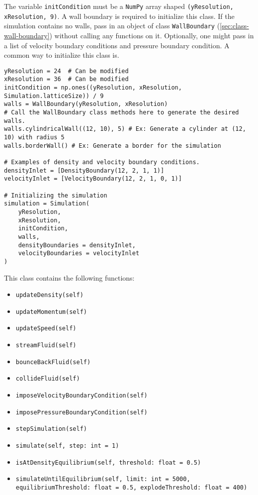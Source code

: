 The variable \texttt{initCondition} must be a \texttt{NumPy} array shaped \texttt{(yResolution, xResolution, 9)}. A wall boundary is required to initialize this class. If the simulation contains no walls, pass in an object of class \texttt{WallBoundary} (\cref{sec:class-wall-boundary}) without calling any functions on it. Optionally, one might pass in a list of velocity boundary conditions and pressure boundary condition. A common way to initialize this class is.
\begin{verbatim}
yResolution = 24  # Can be modified
xResolution = 36  # Can be modified
initCondition = np.ones((yResolution, xResolution, Simulation.latticeSize)) / 9
walls = WallBoundary(yResolution, xResolution)
# Call the WallBoundary class methods here to generate the desired walls.
walls.cylindricalWall((12, 10), 5) # Ex: Generate a cylinder at (12, 10) with radius 5
walls.borderWall() # Ex: Generate a border for the simulation

# Examples of density and velocity boundary conditions.
densityInlet = [DensityBoundary(12, 2, 1, 1)]
velocityInlet = [VelocityBoundary(12, 2, 1, 0, 1)]

# Initializing the simulation
simulation = Simulation(
    yResolution,
    xResolution,
    initCondition,
    walls,
    densityBoundaries = densityInlet,
    velocityBoundaries = velocityInlet
)
\end{verbatim}

This class contains the following functions:
\begin{itemize}[noitemsep]
	\item \texttt{updateDensity(self)}
	\item \texttt{updateMomentum(self)}
	\item \texttt{updateSpeed(self)}
	\item \texttt{streamFluid(self)}
	\item \texttt{bounceBackFluid(self)}
	\item \texttt{collideFluid(self)}
	\item \texttt{imposeVelocityBoundaryCondition(self)}
	\item \texttt{imposePressureBoundaryCondition(self)}
	\item \texttt{stepSimulation(self)}
	\item \texttt{simulate(self, step: int = 1)}
	\item \texttt{isAtDensityEquilibrium(self, threshold: float = 0.5)}
	\item \texttt{simulateUntilEquilibrium(self, limit: int = 5000, equilibriumThreshold: float = 0.5, explodeThreshold: float = 400)}
\end{itemize}
